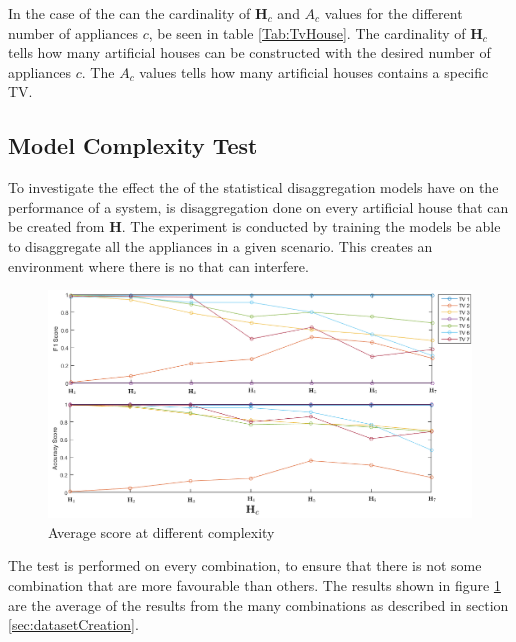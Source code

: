 

In the case of the  can the cardinality of $\textbf{H}_c$ and $A_c$ values for the different number of appliances $c$, be seen in table \ref{Tab:TvHouse}. The cardinality of $\textbf{H}_c$ tells how many artificial houses can be constructed with the desired number of appliances $c$. The $A_c$ values tells how many artificial houses contains a specific TV.


\subsection{Model Complexity Test}
\label{sec:MCT}
To investigate the effect the  of the statistical disaggregation models have on the performance of a  system, is disaggregation done on every artificial house that can be created from $\textbf{H}$. The experiment is conducted by training the models be able to disaggregate all the appliances in a given scenario. This creates an environment where there is no  that can interfere.

\begin{figure}[H]
\centering
\includegraphics[width=1\textwidth]{billeder/ModelSize.png}
\caption{Average score at different complexity }
\label{fig:COMPT}
\end{figure}

The test is performed on every combination, to ensure that there is not some combination that are more favourable than others. The results shown in figure \ref{fig:COMPT} are the average of the results from the many combinations as described in section \ref{sec:datasetCreation}. 

